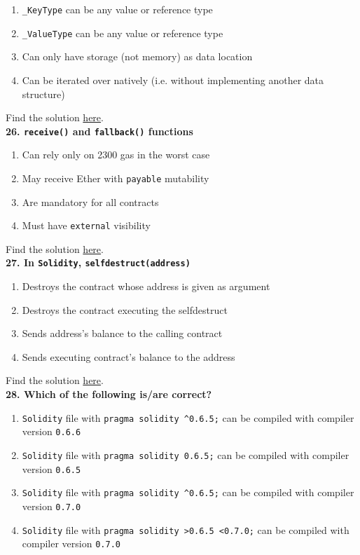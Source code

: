\begin{enumerate}[label=\Alph*.]
    \item\verb|_KeyType| can be any value or reference type
    \item\verb|_ValueType| can be any value or reference type
    \item Can only have storage (not memory) as data location
    \item Can be iterated over natively (i.e. without implementing another data structure)
\end{enumerate}

Find the solution \hyperref[sec:exam2_q25]{here}.\\

\textbf{26. \texttt{receive()} and \texttt{fallback()} functions}

\begin{enumerate}[label=\Alph*.]
    \item Can rely only on 2300 gas in the worst case
    \item May receive Ether with \verb|payable| mutability
    \item Are mandatory for all contracts
    \item Must have \verb|external| visibility
\end{enumerate}

Find the solution \hyperref[sec:exam2_q26]{here}.\\

\textbf{27. In \texttt{Solidity}, \texttt{selfdestruct(address)}}

\begin{enumerate}[label=\Alph*.]
    \item Destroys the contract whose address is given as argument
    \item Destroys the contract executing the selfdestruct
    \item Sends address's balance to the calling contract
    \item Sends executing contract's balance to the address
\end{enumerate}

Find the solution \hyperref[sec:exam2_q27]{here}.\\

\textbf{28. Which of the following is/are correct?}

\begin{enumerate}[label=\Alph*.]
    \item\verb|Solidity| file with \verb|pragma solidity ^0.6.5;| can be compiled with compiler version \verb|0.6.6|
    \item\verb|Solidity| file with \verb|pragma solidity 0.6.5;| can be compiled with compiler version \verb|0.6.5|
    \item\verb|Solidity| file with \verb|pragma solidity ^0.6.5;| can be compiled with compiler version \verb|0.7.0|
    \item\verb|Solidity| file with \verb|pragma solidity >0.6.5 <0.7.0;| can be compiled with compiler version \verb|0.7.0|
\end{enumerate}

